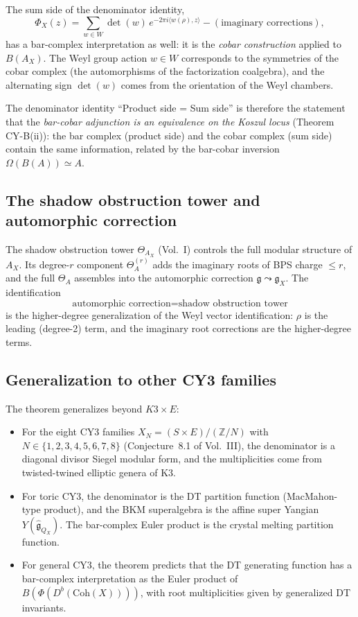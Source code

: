 \documentclass[11pt]{article}
\theoremstyle{definition}
\theoremstyle{remark}
\newcommand{\frakg}{\mathfrak{g}}
\begin{document}
The sum side of the denominator identity,
\[
 \Phi_X(z) = \sum_{w \in W} \det(w)\, e^{-2\pi i\langle w(\rho),z\rangle}
 - (\text{imaginary corrections}),
\]
has a bar-complex interpretation as well: it is the \emph{cobar construction}
applied to $B(A_X)$. The Weyl group action $w \in W$ corresponds to the
symmetries of the cobar complex (the automorphisms of the factorization
coalgebra), and the alternating sign $\det(w)$ comes from the orientation
of the Weyl chambers.

The denominator identity ``Product side = Sum side'' is therefore the
statement that the \emph{bar-cobar adjunction is an equivalence on the
Koszul locus} (Theorem CY-B(ii)): the bar complex (product side) and the
cobar complex (sum side) contain the same information, related by the
bar-cobar inversion $\Omega(B(A)) \simeq A$.

\subsection{The shadow obstruction tower and automorphic correction}

The shadow obstruction tower $\Theta_{A_X}$ (Vol.~I) controls the full
modular structure of $A_X$. Its degree-$r$ component $\Theta^{(r)}_A$
adds the imaginary roots of BPS charge $\leq r$, and the full
$\Theta_A$ assembles into the automorphic correction
$\frakg \leadsto \frakg_X$. The identification
\[
 \text{automorphic correction} = \text{shadow obstruction tower}
\]
is the higher-degree generalization of the Weyl vector identification:
$\rho$ is the leading (degree-2) term, and the imaginary root corrections
are the higher-degree terms.

\subsection{Generalization to other CY3 families}

The theorem generalizes beyond $K3 \times E$:
\begin{itemize}[itemsep=2pt]
\item For the eight CY3 families $X_N = (S \times E)/(\mathbb{Z}/N)$ with
 $N \in \{1,2,3,4,5,6,7,8\}$ (Conjecture~8.1 of Vol.~III), the
 denominator is a diagonal divisor Siegel modular form, and the
 multiplicities come from twisted-twined elliptic genera of K3.
\item For toric CY3, the denominator is the DT partition function
 (MacMahon-type product), and the BKM superalgebra is the affine
 super Yangian $Y(\widehat{\frakg}_{Q_X})$. The bar-complex Euler
 product is the crystal melting partition function.
\item For general CY3, the theorem predicts that the DT generating
 function has a bar-complex interpretation as the Euler product of
 $B(\Phi(D^b(\mathrm{Coh}(X))))$, with root multiplicities given by
 generalized DT invariants.
\end{itemize}
\end{document}
